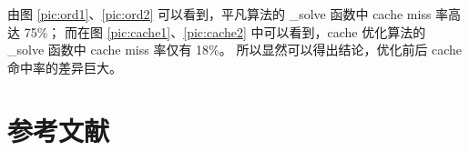 \documentclass[a4paper]{article}
\begin{document}
由图 \ref{pic:ord1}、\ref{pic:ord2} 可以看到，平凡算法的 _solve 函数中 cache miss 率高达 75\%；
而在图 \ref{pic:cache1}、\ref{pic:cache2} 中可以看到，cache 优化算法的 _solve 函数中 cache miss 率仅有 18\%。
所以显然可以得出结论，优化前后 cache 命中率的差异巨大。

\newpage

\section{参考文献}
\cite{1}\cite{2}\cite{3}\cite{4}\cite{5}\cite{6}



\end{document}
